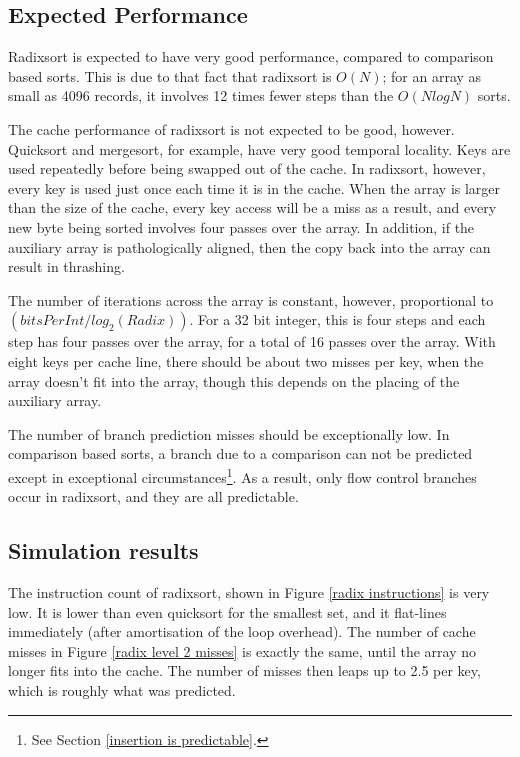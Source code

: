 \subsection{Expected Performance}
Radixsort is expected to have very good performance, compared to comparison
based sorts. This is due to that fact that radixsort is $O(N)$; for an array
as small as 4096 records, it involves 12 times fewer steps than the $O(NlogN)$ sorts.

The cache performance of radixsort is not expected to be good, however.
Quicksort and mergesort, for example, have very good temporal locality. Keys are
used repeatedly before being swapped out of the cache. In radixsort, however,
every key is used just once each time it is in the cache. When the array is larger than
the size of the cache, every key access will be a miss as a result, and every
new byte being sorted involves four passes over the array. In addition, if the
auxiliary array is pathologically aligned, then the copy back into the array
can result in thrashing.

The number of iterations across the array is constant, however, proportional to
$(bitsPerInt/log_2(Radix))$. For a 32 bit integer, this is four steps and each step
has four passes over the array, for a total of 16 passes over the array.  With
eight  keys per cache line, there should be about two misses per key, when the
array doesn't fit into the array, though this depends on the placing of the
auxiliary array.

The number of branch prediction misses should be exceptionally low. In
comparison based sorts, a branch due to a comparison can not be predicted except
in exceptional circumstances\footnote{See Section \ref{insertion is
predictable}.}. As a result, only flow control branches occur in radixsort, and
they are all predictable.

\subsection{Simulation results}

The instruction count of radixsort, shown in Figure \ref{radix instructions} is
very low. It is lower than even quicksort for the smallest set, and it
flat-lines immediately (after amortisation of the loop overhead). The number of
cache misses in Figure \ref{radix level 2 misses} is exactly the same, until the
array no longer fits into the cache. The number of misses then leaps up to 2.5
per
key, which is roughly what was predicted.

